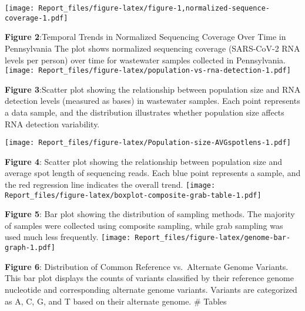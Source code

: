 \documentclass[
]{article}
\begin{document}
\texttt{[image: Report\_files/figure-latex/figure-1,normalized-sequence-coverage-1.pdf]}

\textbf{Figure 2}:Temporal Trends in Normalized Sequencing Coverage Over
Time in Pennsylvania The plot shows normalized sequencing coverage
(SARS-CoV-2 RNA levels per person) over time for wastewater samples
collected in Pennsylvania.
\texttt{[image: Report\_files/figure-latex/population-vs-rna-detection-1.pdf]}

\textbf{Figure 3}:Scatter plot showing the relationship between
population size and RNA detection levels (measured as bases) in
wastewater samples. Each point represents a data sample, and the
distribution illustrates whether population size affects RNA detection
variability.

\texttt{[image: Report\_files/figure-latex/Population-size-AVGspotlens-1.pdf]}

\textbf{Figure 4}: Scatter plot showing the relationship between
population size and average spot length of sequencing reads. Each blue
point represents a sample, and the red regression line indicates the
overall trend.
\texttt{[image: Report\_files/figure-latex/boxplot-composite-grab-table-1.pdf]}

\textbf{Figure 5}: Bar plot showing the distribution of sampling
methods. The majority of samples were collected using composite
sampling, while grab sampling was used much less frequently.
\texttt{[image: Report\_files/figure-latex/genome-bar-graph-1.pdf]}

\textbf{Figure 6}: Distribution of Common Reference vs.~Alternate Genome
Variants. This bar plot displays the counts of variants classified by
their reference genome nucleotide and corresponding alternate genome
variants. Variants are categorized as A, C, G, and T based on their
alternate genome. \# Tables
\end{document}

